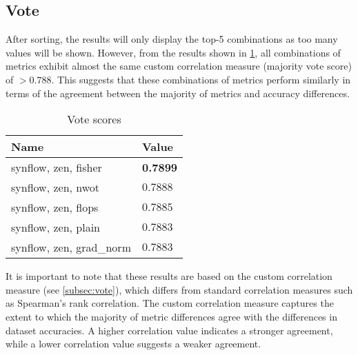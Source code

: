 
\subsection{Vote}

After sorting, the results will only display the top-5 combinations as too many values will be shown. However, from the results shown in \cref{tab:vote}, all combinations of metrics exhibit almost the same custom correlation measure (majority vote score) of $ > 0.788$. This suggests that these combinations of metrics perform similarly in terms of the agreement between the majority of metrics and accuracy differences.

\begin{table}[h!]
\caption{Vote scores}
\centering
\begin{tabular}{ll}
\textbf{Name} & \textbf{Value} \\ \hline
\multicolumn{1}{l|}{synflow, zen, fisher} & \textbf{0.7899} \\
\multicolumn{1}{l|}{\cellcolor{verylightgray}synflow, zen, nwot} & \cellcolor{verylightgray}$0.7888$ \\
\multicolumn{1}{l|}{synflow, zen, flops} & $0.7885$ \\
\multicolumn{1}{l|}{\cellcolor{verylightgray}synflow, zen, plain} & \cellcolor{verylightgray}$0.7883$ \\
\multicolumn{1}{l|}{synflow, zen, grad\_norm} & $0.7883$ \\
\end{tabular}
\label{tab:vote}
\end{table}

It is important to note that these results are based on the custom correlation measure (see \cref{subsec:vote}), which differs from standard correlation measures such as Spearman's rank correlation. The custom correlation measure captures the extent to which the majority of metric differences agree with the differences in dataset accuracies. A higher correlation value indicates a stronger agreement, while a lower correlation value suggests a weaker agreement.
